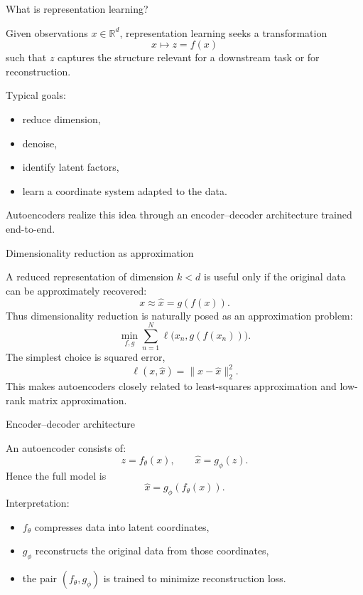 \documentclass[aspectratio=169]{beamer}
\begin{document}
\begin{frame}{What is representation learning?}

Given observations \(x\in\mathbb{R}^d\), representation learning seeks a transformation
\[
x \mapsto z = f(x)
\]
such that \(z\) captures the structure relevant for a downstream task or for reconstruction.

Typical goals:
\begin{itemize}
\item reduce dimension,
\item denoise,
\item identify latent factors,
\item learn a coordinate system adapted to the data.
\end{itemize}

Autoencoders realize this idea through an encoder--decoder architecture trained end-to-end.

\end{frame}

\begin{frame}{Dimensionality reduction as approximation}

A reduced representation of dimension \(k<d\) is useful only if the original data can be approximately recovered:
\[
x \approx \hat x = g(f(x)).
\]
Thus dimensionality reduction is naturally posed as an approximation problem:
\[
\min_{f,g} \sum_{n=1}^N \ell\bigl(x_n,g(f(x_n))\bigr).
\]
The simplest choice is squared error,
\[
\ell(x,\hat x)=\|x-\hat x\|_2^2.
\]
This makes autoencoders closely related to least-squares approximation and low-rank matrix approximation.

\end{frame}

\begin{frame}{Encoder--decoder architecture}

An autoencoder consists of:
\[
z = f_\theta(x), \qquad \hat x = g_\phi(z).
\]
Hence the full model is
\[
\hat x = g_\phi(f_\theta(x)).
\]
Interpretation:
\begin{itemize}
\item \(f_\theta\) compresses data into latent coordinates,
\item \(g_\phi\) reconstructs the original data from those coordinates,
\item the pair \((f_\theta,g_\phi)\) is trained to minimize reconstruction loss.
\end{itemize}

\end{frame}
\end{document}
